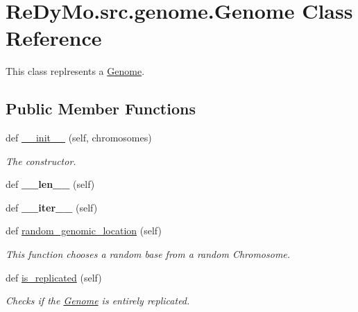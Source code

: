 \hypertarget{classReDyMo_1_1src_1_1genome_1_1Genome}{}\section{Re\+Dy\+Mo.\+src.\+genome.\+Genome Class Reference}
\label{classReDyMo_1_1src_1_1genome_1_1Genome}


This class replresents a \mbox{\hyperlink{classReDyMo_1_1src_1_1genome_1_1Genome}{Genome}}.  


\subsection*{Public Member Functions}
\begin{DoxyCompactItemize}
\item 
\mbox{\label{classReDyMo_1_1src_1_1genome_1_1Genome_a2b10f0f1f2fab2f4247abcb2cb778f3c}} 
def \mbox{\hyperlink{classReDyMo_1_1src_1_1genome_1_1Genome_a2b10f0f1f2fab2f4247abcb2cb778f3c}{\+\_\+\+\_\+init\+\_\+\+\_\+}} (self, chromosomes)
\begin{DoxyCompactList}\small\item\em The constructor. \end{DoxyCompactList}\item 
\mbox{\label{classReDyMo_1_1src_1_1genome_1_1Genome_a740e2b6724ec98af5c42c31575816815}} 
def {\bfseries \+\_\+\+\_\+len\+\_\+\+\_\+} (self)
\item 
\mbox{\label{classReDyMo_1_1src_1_1genome_1_1Genome_a7e9435861195e29ecb2130430ec909ef}} 
def {\bfseries \+\_\+\+\_\+iter\+\_\+\+\_\+} (self)
\item 
def \mbox{\hyperlink{classReDyMo_1_1src_1_1genome_1_1Genome_a52ff5976c29d7f3308634d1806f0e6e5}{random\+\_\+genomic\+\_\+location}} (self)
\begin{DoxyCompactList}\small\item\em This function chooses a random base from a random Chromosome. \end{DoxyCompactList}\item 
def \mbox{\hyperlink{classReDyMo_1_1src_1_1genome_1_1Genome_a8351b706fc6f5c0f218c1dab6c04da46}{is\+\_\+replicated}} (self)
\begin{DoxyCompactList}\small\item\em Checks if the \mbox{\hyperlink{classReDyMo_1_1src_1_1genome_1_1Genome}{Genome}} is entirely replicated. \end{DoxyCompactList}\item 

\end{DoxyCompactItemize}
